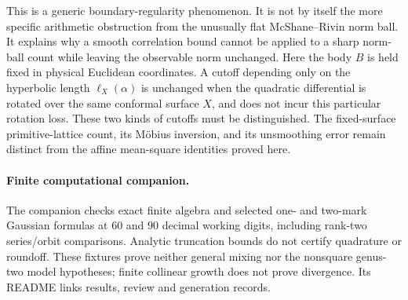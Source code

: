 This is a generic boundary-regularity phenomenon. It is not by
itself the more specific arithmetic obstruction from the unusually
flat McShane--Rivin norm ball. It explains why a smooth correlation
bound cannot be applied to a sharp norm-ball count while leaving
the observable norm unchanged. Here the body $B$ is held fixed in
physical Euclidean coordinates. A cutoff depending only on the
hyperbolic length $\ell_X(\alpha)$ is unchanged when the quadratic
differential is rotated over the same conformal surface $X$, and
does not incur this particular rotation loss. These two kinds of
cutoffs must be distinguished. The fixed-surface primitive-lattice
count, its M\"obius inversion, and its unsmoothing error remain
distinct from the affine mean-square identities proved here.

\paragraph{Finite computational companion.}
The companion  checks exact finite
algebra and selected one- and two-mark Gaussian formulas at $60$ and
$90$ decimal working digits, including rank-two series/orbit comparisons.
Analytic truncation bounds do not certify quadrature or roundoff.
These fixtures prove neither general mixing nor the nonsquare genus-two
model hypotheses; finite collinear growth does not prove divergence.
Its README links results, review and generation records.

